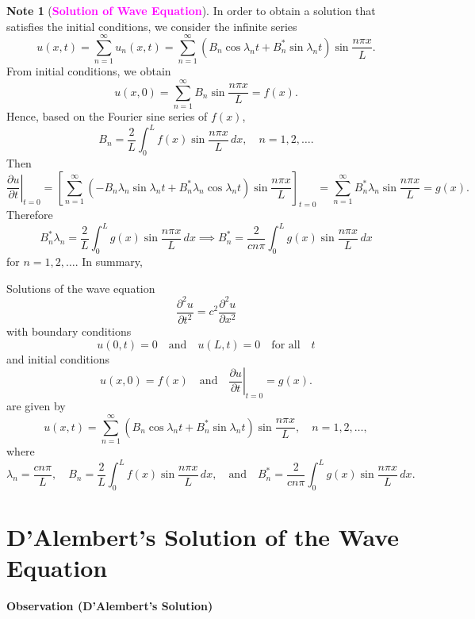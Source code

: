 \documentclass[12pt,openany]{book}
\theoremstyle{definition}
\newtheorem*{note}{Note}
\begin{document}
	\begin{note}[\textcolor{magenta}{\bf Solution of Wave Equation}]
		In order to obtain a solution that satisfies the initial conditions, we consider the infinite series
		\begin{equation*}
			u(x, t) = \sum_{n=1}^{\infty} u_n(x, t) = \sum_{n=1}^{\infty} (B_n \cos \lambda_n t + B_n^* \sin \lambda_n t) \sin \frac{n\pi x}{L}.
		\end{equation*}
		From initial conditions, we obtain
		\[
		u(x, 0) = \sum_{n=1}^{\infty} B_n \sin \frac{n\pi x}{L} = f(x).
		\] Hence, based on the Fourier sine series of \( f(x) \),
		\[
		B_n = \frac{2}{L} \int_0^{L} f(x) \sin \frac{n\pi x}{L} \, dx, \quad n = 1,2,\dots.
		\] Then \[
		\left. \frac{\partial u}{\partial t} \right|_{t=0} = \left[ \sum_{n=1}^{\infty} ( -B_n \lambda_n \sin \lambda_n t + B_n^* \lambda_n \cos \lambda_n t) \sin \frac{n\pi x}{L} \right]_{t=0} = \sum_{n=1}^{\infty} B_n^* \lambda_n \sin \frac{n\pi x}{L} = g(x).
		\]
		Therefore
		\[
		B_n^* \lambda_n = \frac{2}{L} \int_0^{L} g(x) \sin \frac{n\pi x}{L} \, dx\implies B_n^* = \frac{2}{c n \pi} \int_0^{L} g(x) \sin \frac{n\pi x}{L} \, dx
		\]
		for \( n = 1,2,\dots \). In summary,
		\vspace{4pt}
		\begin{tcolorbox}
			Solutions of the wave equation
			\[
			\frac{\partial^2 u}{\partial t^2} = c^2 \frac{\partial^2 u}{\partial x^2}
			\]
			with boundary conditions
			\[
			u(0,t) = 0 \quad \text{and} \quad u(L,t) = 0 \quad \text{for all} \quad t
			\]
			and initial conditions
			\[
			u(x, 0) = f(x) \quad \text{and} \quad \left. \frac{\partial u}{\partial t} \right|_{t=0} = g(x).
			\]
			are given by
			\[
			u(x, t) = \sum_{n=1}^{\infty} (B_n \cos \lambda_n t + B_n^* \sin \lambda_n t) \sin \frac{n\pi x}{L}, \quad n = 1,2,\dots,
			\]
			where
			\[
			\lambda_n = \frac{c n \pi}{L}, \quad B_n = \frac{2}{L} \int_0^{L} f(x) \sin \frac{n\pi x}{L} \, dx, \quad \text{and} \quad B_n^* = \frac{2}{c n \pi} \int_0^{L} g(x) \sin \frac{n\pi x}{L} \, dx.
			\]
		\end{tcolorbox}
	\end{note}

	
	\section{D’Alembert’s Solution of the Wave Equation}
	\textbf{Observation (D'Alembert's Solution)}
	
\end{document}
